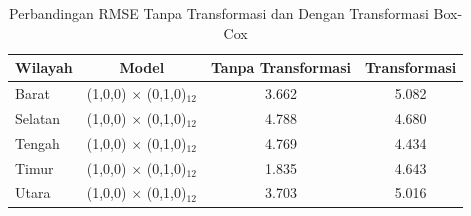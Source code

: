 \begin{table}[H]
    \centering
    \caption{Perbandingan RMSE Tanpa Transformasi dan Dengan Transformasi Box-Cox}
    \label{table:perbandingan-rmse}
    \begin{tabular}{lccc}
        \toprule
        \textbf{Wilayah} & \textbf{Model} & \textbf{Tanpa Transformasi} & \textbf{Transformasi} \\
        \midrule
        Barat   & (1,0,0) $\times$ (0,1,0)$_{12}$ & 3.662 & 5.082 \\
        Selatan & (1,0,0) $\times$ (0,1,0)$_{12}$ & 4.788 & 4.680 \\
        Tengah  & (1,0,0) $\times$ (0,1,0)$_{12}$ & 4.769 & 4.434 \\
        Timur   & (1,0,0) $\times$ (0,1,0)$_{12}$ & 1.835  & 4.643 \\
        Utara   & (1,0,0) $\times$ (0,1,0)$_{12}$ & 3.703  & 5.016 \\
        \bottomrule
    \end{tabular}
\end{table}